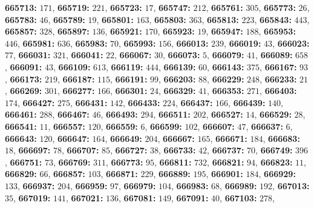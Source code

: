 \textsf{\bfseries 665713:} $171$, \textsf{\bfseries 665719:} $221$, \textsf{\bfseries 665723:} $17$, \textsf{\bfseries 665747:} $212$, \textsf{\bfseries 665761:} $305$, \textsf{\bfseries 665773:} $26$, \textsf{\bfseries 665783:} $46$, \textsf{\bfseries 665789:} $19$, \textsf{\bfseries 665801:} $163$, \textsf{\bfseries 665803:} $363$, \textsf{\bfseries 665813:} $223$, \textsf{\bfseries 665843:} $443$, \textsf{\bfseries 665857:} $328$, \textsf{\bfseries 665897:} $136$, \textsf{\bfseries 665921:} $170$, \textsf{\bfseries 665923:} $19$, \textsf{\bfseries 665947:} $188$, \textsf{\bfseries 665953:} $446$, \textsf{\bfseries 665981:} $636$, \textsf{\bfseries 665983:} $70$, \textsf{\bfseries 665993:} $156$, \textsf{\bfseries 666013:} $239$, \textsf{\bfseries 666019:} $43$, \textsf{\bfseries 666023:} $77$, \textsf{\bfseries 666031:} $321$, \textsf{\bfseries 666041:} $22$, \textsf{\bfseries 666067:} $30$, \textsf{\bfseries 666073:} $5$, \textsf{\bfseries 666079:} $41$, \textsf{\bfseries 666089:} $658$, \textsf{\bfseries 666091:} $43$, \textsf{\bfseries 666109:} $613$, \textsf{\bfseries 666119:} $444$, \textsf{\bfseries 666139:} $60$, \textsf{\bfseries 666143:} $375$, \textsf{\bfseries 666167:} $93$, \textsf{\bfseries 666173:} $219$, \textsf{\bfseries 666187:} $115$, \textsf{\bfseries 666191:} $99$, \textsf{\bfseries 666203:} $88$, \textsf{\bfseries 666229:} $248$, \textsf{\bfseries 666233:} $21$, \textsf{\bfseries 666269:} $301$, \textsf{\bfseries 666277:} $166$, \textsf{\bfseries 666301:} $24$, \textsf{\bfseries 666329:} $41$, \textsf{\bfseries 666353:} $271$, \textsf{\bfseries 666403:} $174$, \textsf{\bfseries 666427:} $275$, \textsf{\bfseries 666431:} $142$, \textsf{\bfseries 666433:} $224$, \textsf{\bfseries 666437:} $166$, \textsf{\bfseries 666439:} $140$, \textsf{\bfseries 666461:} $288$, \textsf{\bfseries 666467:} $46$, \textsf{\bfseries 666493:} $294$, \textsf{\bfseries 666511:} $202$, \textsf{\bfseries 666527:} $14$, \textsf{\bfseries 666529:} $28$, \textsf{\bfseries 666541:} $11$, \textsf{\bfseries 666557:} $120$, \textsf{\bfseries 666559:} $6$, \textsf{\bfseries 666599:} $102$, \textsf{\bfseries 666607:} $47$, \textsf{\bfseries 666637:} $6$, \textsf{\bfseries 666643:} $120$, \textsf{\bfseries 666647:} $164$, \textsf{\bfseries 666649:} $204$, \textsf{\bfseries 666667:} $165$, \textsf{\bfseries 666671:} $184$, \textsf{\bfseries 666683:} $18$, \textsf{\bfseries 666697:} $78$, \textsf{\bfseries 666707:} $85$, \textsf{\bfseries 666727:} $38$, \textsf{\bfseries 666733:} $42$, \textsf{\bfseries 666737:} $70$, \textsf{\bfseries 666749:} $396$, \textsf{\bfseries 666751:} $73$, \textsf{\bfseries 666769:} $311$, \textsf{\bfseries 666773:} $95$, \textsf{\bfseries 666811:} $732$, \textsf{\bfseries 666821:} $94$, \textsf{\bfseries 666823:} $11$, \textsf{\bfseries 666829:} $66$, \textsf{\bfseries 666857:} $103$, \textsf{\bfseries 666871:} $229$, \textsf{\bfseries 666889:} $195$, \textsf{\bfseries 666901:} $184$, \textsf{\bfseries 666929:} $133$, \textsf{\bfseries 666937:} $204$, \textsf{\bfseries 666959:} $97$, \textsf{\bfseries 666979:} $104$, \textsf{\bfseries 666983:} $68$, \textsf{\bfseries 666989:} $192$, \textsf{\bfseries 667013:} $35$, \textsf{\bfseries 667019:} $141$, \textsf{\bfseries 667021:} $136$, \textsf{\bfseries 667081:} $149$, \textsf{\bfseries 667091:} $40$, \textsf{\bfseries 667103:} $278$, 
